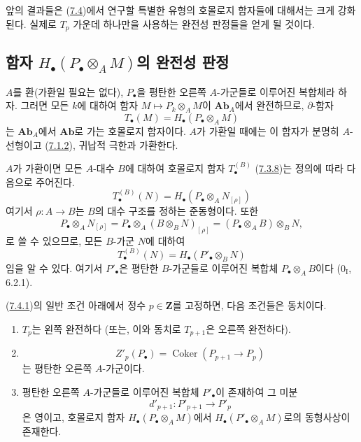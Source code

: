 앞의 결과들은 (\hyperref[subsection:III.7.4.fr]{7.4})에서 연구할
특별한 유형의 호몰로지 함자들에 대해서는 크게 강화된다. 실제로
$T_p$ 가운데 하나만을 사용하는 완전성 판정들을 얻게 될 것이다.

\subsection{함자 $H_\bullet(P_\bullet\otimes_A M)$의 완전성 판정}
\label{subsection:III.7.4.fr}

\begin{env}[7.4.1]
\label{III.7.4.1-fr}
$A$를 환(가환일 필요는 없다), $P_\bullet$을 평탄한 오른쪽
$A$-가군들로 이루어진 복합체라 하자. 그러면 모든 $k$에 대하여 함자
$M\mapsto P_k\otimes_A M$이 $\mathbf{Ab}_A$에서 완전하므로,
$\partial$-함자
\[
  T_\bullet(M)=H_\bullet(P_\bullet\otimes_A M)
  \tag{7.4.1.1}\label{III.7.4.1.1.fr}
\]
는 $\mathbf{Ab}_A$에서 $\mathbf{Ab}$로 가는 호몰로지 함자이다.
$A$가 가환일 때에는 이 함자가 분명히 $A$-선형이고
(\hyperref[III.7.1.2-fr]{7.1.2}), 귀납적 극한과 가환한다.

$A$가 가환이면 모든 $A$-대수 $B$에 대하여 호몰로지 함자
$T_\bullet^{(B)}$ (\hyperref[III.7.3.8-fr]{7.3.8})는 정의에 따라
다음으로 주어진다.
\[
  T_\bullet^{(B)}(N)
  =
  H_\bullet(P_\bullet\otimes_A N_{[\rho]})
  \tag{7.4.1.2}\label{III.7.4.1.2.fr}
\]
여기서 $\rho:A\to B$는 $B$의 대수 구조를 정하는 준동형이다. 또한
\[
  P_\bullet\otimes_A N_{[\rho]}
  =P_\bullet\otimes_A(B\otimes_B N)_{[\rho]}
  =(P_\bullet\otimes_A B)\otimes_B N,
\]
로 쓸 수 있으므로, 모든 $B$-가군 $N$에 대하여
\[
  T_\bullet^{(B)}(N)=H_\bullet(P'_\bullet\otimes_B N)
  \tag{7.4.1.3}\label{III.7.4.1.3.fr}
\]
임을 알 수 있다. 여기서 $P'_\bullet$은 평탄한 $B$-가군들로 이루어진
복합체 $P_\bullet\otimes_A B$이다 ($0_{\mathrm I}$, 6.2.1).
\end{env}

\begin{proposition}[7.4.2]
\label{III.7.4.2-fr}
(\hyperref[III.7.4.1-fr]{7.4.1})의 일반 조건 아래에서 정수
$p\in\mathbf Z$를 고정하면, 다음 조건들은 동치이다.
\begin{enumerate}
  \item[a)] $T_p$는 왼쪽 완전하다 (또는, 이와 동치로 $T_{p+1}$은
    오른쪽 완전하다).
  \item[b)]
    \[
      Z'_p(P_\bullet)
      =
      \operatorname{Coker}(P_{p+1}\longrightarrow P_p)
    \]
    는 평탄한 오른쪽 $A$-가군이다.
  \item[c)] 평탄한 오른쪽 $A$-가군들로 이루어진 복합체
    $P'_\bullet$이 존재하여 그 미분
    \[
      d'_{p+1}:P'_{p+1}\longrightarrow P'_p
    \]
    은 영이고, 호몰로지 함자
    $H_\bullet(P_\bullet\otimes_A M)$에서
    $H_\bullet(P'_\bullet\otimes_A M)$로의 동형사상이 존재한다.
\end{enumerate}
\end{proposition}

